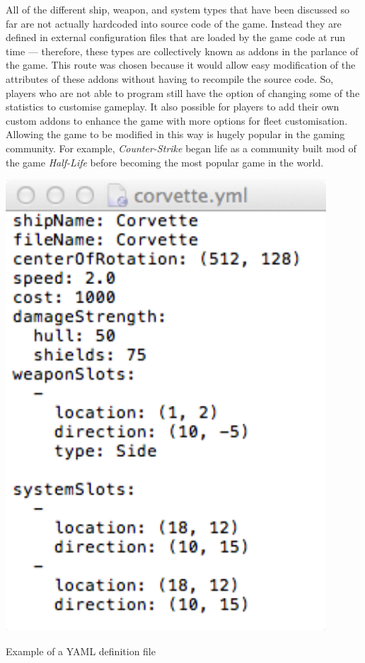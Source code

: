 All of the different ship, weapon, and system types that have been discussed so far are not actually hardcoded into source code of the game. Instead they are defined in external configuration files that are loaded by the game code at run time --- therefore, these types are collectively known as addons in the parlance of the game. This route was chosen because it would allow easy modification of the attributes of these addons without having to recompile the source code. So, players who are not able to program still have the option of changing some of the statistics to customise gameplay. It also possible for players to add their own custom addons to enhance the game with more options for fleet customisation. Allowing the game to be modified in this way is hugely popular in the gaming community. For example, \emph{Counter-Strike} began life as a community built mod of the game \emph{Half-Life} before becoming the most popular game in the world.\cite{lambdageneration2012}

\begin{marginfigure}
    \includegraphics{res/configuration/corvetteYaml.pdf}
    \caption{Example of a YAML definition file}
    \label{fig:corvette-yaml}
\end{marginfigure}

